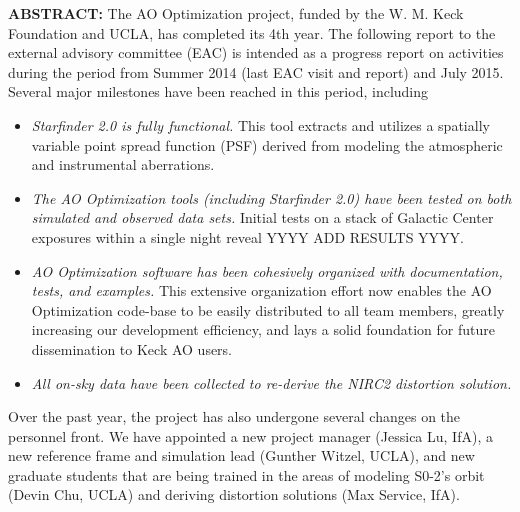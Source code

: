 \textbf{ABSTRACT:} The AO Optimization project, funded by the W. M. Keck Foundation and UCLA, has completed its 4th year. The following report to the external advisory committee (EAC) is intended as a progress report on activities during the period from Summer 2014 (last EAC visit and report) and July 2015. Several major milestones have been reached in this period, including
\begin{itemize}
\item {\em Starfinder 2.0 is fully functional.} This tool extracts and utilizes a spatially variable point spread function (PSF) derived from modeling the atmospheric and instrumental
aberrations. 
\item {\em The AO Optimization tools (including Starfinder 2.0) have been tested on both simulated and observed data sets.} Initial tests on a stack of Galactic Center exposures within a single night reveal YYYY ADD RESULTS YYYY.
\item {\em AO Optimization software has been cohesively organized with documentation, tests, and examples.} This extensive organization effort now enables the AO Optimization code-base to be easily distributed to all team members, greatly increasing our development efficiency, and lays a solid foundation for future dissemination to Keck AO users.
\item {\em All on-sky data have been collected to re-derive the NIRC2 distortion solution.}
\end{itemize}
Over the past year, the project has also undergone several changes on the personnel front. We have appointed a new project manager (Jessica Lu, IfA), a new reference frame and simulation lead (Gunther Witzel, UCLA), and new graduate students that are being trained in the areas of modeling S0-2’s orbit (Devin Chu, UCLA) and deriving distortion solutions (Max Service, IfA). 
